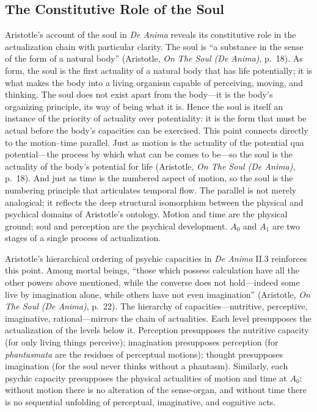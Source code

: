 \subsection*{The Constitutive Role of the Soul}

Aristotle's account of the soul in \textit{De Anima} reveals its constitutive role in the actualization chain with particular clarity. The soul is ``a substance in the sense of the form of a natural body'' (Aristotle, \textit{On The Soul (De Anima)}, p.~18). As form, the soul is the first actuality of a natural body that has life potentially; it is what makes the body into a living organism capable of perceiving, moving, and thinking. The soul does not exist apart from the body---it is the body's organizing principle, its way of being what it is. Hence the soul is itself an instance of the priority of actuality over potentiality: it is the form that must be actual before the body's capacities can be exercised. This point connects directly to the motion--time parallel. Just as motion is the actuality of the potential qua potential---the process by which what can be comes to be---so the soul is the actuality of the body's potential for life (Aristotle, \textit{On The Soul (De Anima)}, p.~18). And just as time is the numbered aspect of motion, so the soul is the numbering principle that articulates temporal flow. The parallel is not merely analogical; it reflects the deep structural isomorphism between the physical and psychical domains of Aristotle's ontology. Motion and time are the physical ground; soul and perception are the psychical development. $A_0$ and $A_1$ are two stages of a single process of actualization.

Aristotle's hierarchical ordering of psychic capacities in \textit{De Anima} II.3 reinforces this point. Among mortal beings, ``those which possess calculation have all the other powers above mentioned, while the converse does not hold---indeed some live by imagination alone, while others have not even imagination'' (Aristotle, \textit{On The Soul (De Anima)}, p.~22). The hierarchy of capacities---nutritive, perceptive, imaginative, rational---mirrors the chain of actualities. Each level presupposes the actualization of the levels below it. Perception presupposes the nutritive capacity (for only living things perceive); imagination presupposes perception (for \textit{phantasmata} are the residues of perceptual motions); thought presupposes imagination (for the soul never thinks without a phantasm). Similarly, each psychic capacity presupposes the physical actualities of motion and time at $A_0$: without motion there is no alteration of the sense-organ, and without time there is no sequential unfolding of perceptual, imaginative, and cognitive acts.

